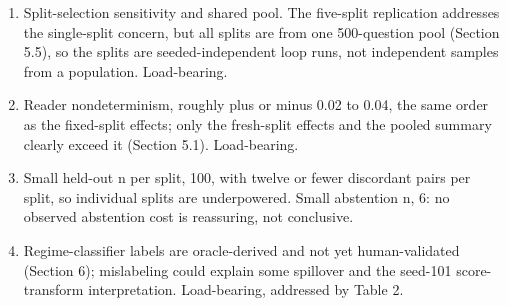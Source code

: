 \begin{enumerate}
\item Split-selection sensitivity and shared pool. The five-split replication addresses the single-split concern, but all splits are from one 500-question pool (Section 5.5), so the splits are seeded-independent loop runs, not independent samples from a population. Load-bearing.
\item Reader nondeterminism, roughly plus or minus 0.02 to 0.04, the same order as the fixed-split effects; only the fresh-split effects and the pooled summary clearly exceed it (Section 5.1). Load-bearing.
\item Small held-out n per split, 100, with twelve or fewer discordant pairs per split, so individual splits are underpowered. Small abstention n, 6: no observed abstention cost is reassuring, not conclusive.
\item Regime-classifier labels are oracle-derived and not yet human-validated (Section 6); mislabeling could explain some spillover and the seed-101 score-transform interpretation. Load-bearing, addressed by Table 2.

\end{enumerate}
